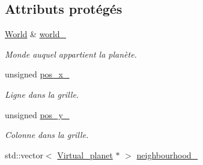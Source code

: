 \subsection*{Attributs protégés}
\begin{DoxyCompactItemize}
\item 
\hypertarget{classVirtual__planet_a16ff82fac346eec9d2229fb8c09e3807}{\hyperlink{classWorld}{World} \& \hyperlink{classVirtual__planet_a16ff82fac346eec9d2229fb8c09e3807}{world\-\_\-}}\label{classVirtual__planet_a16ff82fac346eec9d2229fb8c09e3807}

\begin{DoxyCompactList}\small\item\em Monde auquel appartient la planète. \end{DoxyCompactList}\item 
\hypertarget{classVirtual__planet_ad03593bd1a1236933b638f6079f639b1}{unsigned \hyperlink{classVirtual__planet_ad03593bd1a1236933b638f6079f639b1}{pos\-\_\-x\-\_\-}}\label{classVirtual__planet_ad03593bd1a1236933b638f6079f639b1}

\begin{DoxyCompactList}\small\item\em Ligne dans la grille. \end{DoxyCompactList}\item 
\hypertarget{classVirtual__planet_aa7e03c8010b64d2528d5edb5651962a9}{unsigned \hyperlink{classVirtual__planet_aa7e03c8010b64d2528d5edb5651962a9}{pos\-\_\-y\-\_\-}}\label{classVirtual__planet_aa7e03c8010b64d2528d5edb5651962a9}

\begin{DoxyCompactList}\small\item\em Colonne dans la grille. \end{DoxyCompactList}\item 
\hypertarget{classVirtual__planet_a353b64093f5c146de64a2f694738b65b}{std\-::vector$<$ \hyperlink{classVirtual__planet}{Virtual\-\_\-planet} $\ast$ $>$ \hyperlink{classVirtual__planet_a353b64093f5c146de64a2f694738b65b}{neighbourhood\-\_\-}}\label{classVirtual__planet_a353b64093f5c146de64a2f694738b65b}


\end{DoxyCompactItemize}
